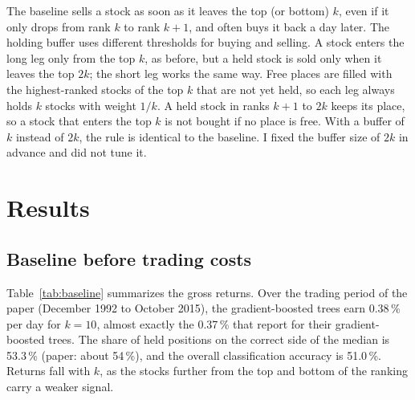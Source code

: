 \documentclass[11pt,a4paper]{article}
\theoremstyle{definition}
\theoremstyle{remark}
\begin{document}
The baseline sells a stock as soon as it leaves the top (or bottom) $k$, even if
it only drops from rank $k$ to rank $k+1$, and often buys it back a day later.
The holding buffer uses different thresholds for buying and selling. A stock
enters the long leg only from the top $k$, as before, but a held stock is sold
only when it leaves the top $2k$; the short leg works the same way. Free places
are filled with the highest-ranked stocks of the top $k$ that are not yet held,
so each leg always holds $k$ stocks with weight $1/k$. A held stock in ranks
$k+1$ to $2k$ keeps its place, so a stock that enters the top $k$ is not bought
if no place is free. With a buffer of $k$ instead of $2k$, the rule is
identical to the baseline. I fixed the buffer size of $2k$ in advance and did
not tune it.


\section{Results}

\subsection{Baseline before trading costs}

Table~\ref{tab:baseline} summarizes the gross returns. Over the trading period
of the paper (December 1992 to October 2015), the gradient-boosted trees earn
0.38\,\% per day for $k = 10$, almost exactly the 0.37\,\% that
\citet{krauss2017deep} report for their gradient-boosted trees. The share of
held positions on the correct side of the median is 53.3\,\% (paper: about
54\,\%), and the overall classification accuracy is 51.0\,\%. Returns fall with
$k$, as the stocks further from the top and bottom of the ranking carry a
weaker signal.
\end{document}
